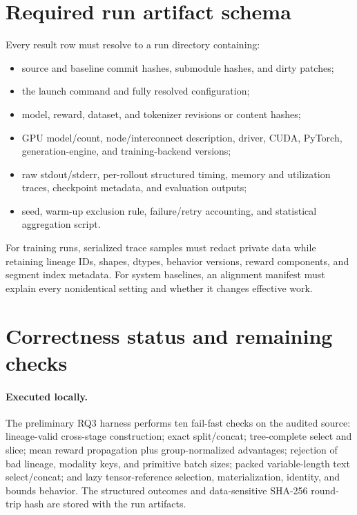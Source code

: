 \documentclass[10pt]{article}
\begin{document}
\section{Required run artifact schema}
\label{app:artifacts}

Every result row must resolve to a run directory containing:
\begin{itemize}
  \item source and baseline commit hashes, submodule hashes, and dirty patches;
  \item the launch command and fully resolved configuration;
  \item model, reward, dataset, and tokenizer revisions or content hashes;
  \item GPU model/count, node/interconnect description, driver, CUDA, PyTorch, generation-engine, and training-backend versions;
  \item raw stdout/stderr, per-rollout structured timing, memory and utilization traces, checkpoint metadata, and evaluation outputs;
  \item seed, warm-up exclusion rule, failure/retry accounting, and statistical aggregation script.
\end{itemize}

For training runs, serialized trace samples must redact private data while retaining lineage IDs, shapes, dtypes, behavior versions, reward components, and segment index metadata.
For system baselines, an alignment manifest must explain every nonidentical setting and whether it changes effective work.

\clearpage
\section{Correctness status and remaining checks}
\label{app:correctness}

\paragraph{Executed locally.}
The preliminary RQ3 harness performs ten fail-fast checks on the audited source:
lineage-valid cross-stage construction; exact split/concat; tree-complete select and
slice; mean reward propagation plus group-normalized advantages; rejection of bad
lineage, modality keys, and primitive batch sizes; packed variable-length text
select/concat; and lazy tensor-reference selection, materialization, identity, and
bounds behavior. The structured outcomes and data-sensitive SHA-256 round-trip hash
are stored with the run artifacts.
\end{document}
